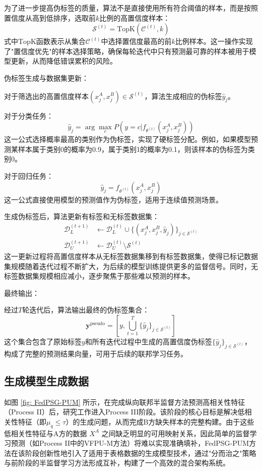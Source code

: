 为了进一步提高伪标签的质量，算法不是直接使用所有符合阈值的样本，而是按照置信度从高到低排序，选取前$k$比例的高置信度样本：
\begin{equation}
	\mathcal{S}^{(t)} = \text{TopK}(\mathcal{C}^{(t)}, k)
\end{equation}
式中$\text{TopK}$函数表示从集合$\mathcal{C}^{(t)}$中选择置信度最高的前$k$比例样本。这一操作实现了"置信度优先"的样本选择策略，确保每轮迭代中只有预测最可靠的样本被用于模型更新，从而降低错误累积的风险。

伪标签生成与数据集更新：

对于筛选出的高置信度样本$(x^A_j,x^B_j) \in \mathcal{S}^{(t)}$，算法生成相应的伪标签$\hat{y}_j$。

对于分类任务：
\begin{equation}
	\hat{y}_j = \arg\max_c P(y=c|f_{\theta^{(t)}}(x^A_j,x^B_j))
\end{equation}
这一公式选择概率最高的类别作为伪标签，实现了硬标签分配。例如，如果模型预测某样本属于类别0的概率为0.9，属于类别1的概率为0.1，则该样本的伪标签为类别0。

对于回归任务：
\begin{equation}
	\hat{y}_j = f_{\theta^{(t)}}(x^A_j,x^B_j)
\end{equation}
这一公式直接使用模型的预测值作为伪标签，适用于连续值预测场景。

生成伪标签后，算法更新有标签和无标签数据集：
\begin{align}
	\mathcal{D}_L^{(t+1)} &\leftarrow \mathcal{D}_L^{(t)} \cup \{(x^A_j,x^B_j,\hat{y}_j)\}_{j\in\mathcal{S}^{(t)}} \\
	\mathcal{D}_U^{(t+1)} &\leftarrow \mathcal{D}_U^{(t)} \setminus \mathcal{S}^{(t)}
\end{align}
这一更新过程将高置信度样本从无标签数据集移到有标签数据集，使得已标记数据集规模随着迭代过程不断扩大，为后续的模型训练提供更多的监督信号。同时，无标签数据集规模相应减小，逐步聚焦于那些难以预测的样本。

最终输出：

经过$T$轮迭代后，算法输出最终的伪标签集合：
\begin{equation}
	\mathbf{y}^{\text{pseudo}} = \left[ y, \bigcup_{t=1}^{T} \{\hat{y}_j\}_{j \in \mathcal{S}^{(t)}} \right]
\end{equation}
这个集合包含了原始标签$y$和所有迭代过程中生成的高置信度伪标签$\{\hat{y}_j\}_{j \in \mathcal{S}^{(t)}}$，构成了完整的预测结果向量，可用于后续的联邦学习任务。


\subsection{生成模型生成数据}
如图 \ref{fig: FedPSG-PUM} 所示，在完成纵向联邦半监督方法预测高相关性特征（Process II）后，研究工作进入Process III阶段。该阶段的核心目标是解决低相关性特征（即$\mu_q \leq \tau$）的生成问题，从而完成B方缺失样本的完整构建。由于这些低相关性特征与A方的数据 $X^A$ 之间缺乏明显的可用映射关系，因此简单的监督学习预测（如Process II中的VFPU-M方法）将难以实现准确填补，FedPSG-PUM方法在该阶段创新性地引入了适用于表格数据的生成模型技术，通过"分而治之"策略与前阶段的半监督学习方法形成互补，构建了一个高效的混合架构系统。


